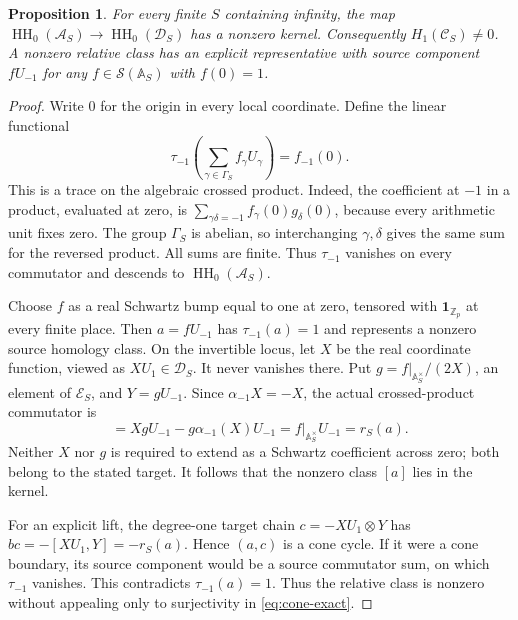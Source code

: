 \documentclass[11pt,letterpaper]{article}
\newtheorem{proposition}[theorem]{Proposition}
\theoremstyle{definition}
\theoremstyle{remark}
\newcommand{\Z}{\mathbb Z}
\newcommand{\Sch}{\mathcal S}
\newcommand{\Acal}{\mathcal A}
\newcommand{\HH}{\operatorname{HH}}
\newcommand{\ind}{\mathbf1}
\begin{document}
\begin{proposition}\label{prop:origin-class}
For every finite $S$ containing infinity, the map
$\HH_0(\Acal_S)\to\HH_0(\mathscr D_S)$ has a nonzero kernel.
Consequently $H_1(\mathscr C_S)\ne0$. A nonzero relative class
has an explicit representative with source component
$fU_{-1}$ for any $f\in\Sch(\mathbb A_S)$ with $f(0)=1$.
\end{proposition}
\begin{proof}
Write $0$ for the origin in every local coordinate. Define the
linear functional
\begin{equation}
 \tau_{-1}\left(\sum_{\gamma\in\Gamma_S}f_\gamma U_\gamma\right)
                     =f_{-1}(0).
 \label{eq:origin-trace}
\end{equation}
This is a trace on the algebraic crossed product. Indeed, the
coefficient at $-1$ in a product, evaluated at zero, is
$\sum_{\gamma\delta=-1}f_\gamma(0)g_\delta(0)$, because every
arithmetic unit fixes zero. The group $\Gamma_S$ is abelian,
so interchanging $\gamma,\delta$ gives the same sum for the
reversed product. All sums are finite. Thus $\tau_{-1}$
vanishes on every commutator and descends to $\HH_0(\Acal_S)$.

Choose $f$ as a real Schwartz bump equal to one at zero,
tensored with $\ind_{\Z_p}$ at every finite place. Then
$a=fU_{-1}$ has $\tau_{-1}(a)=1$ and represents a nonzero
source homology class.
On the invertible locus, let $X$ be the real coordinate function,
viewed as $XU_1\in\mathscr D_S$. It never vanishes there.
Put $g=f|_{\mathbb A_S^\times}/(2X)$, an element of
$\mathscr E_S$, and $Y=gU_{-1}$. Since
$\alpha_{-1}X=-X$, the actual crossed-product commutator is
\begin{equation}
 [XU_1,Y]=XgU_{-1}-g\alpha_{-1}(X)U_{-1}
                  =f|_{\mathbb A_S^\times}U_{-1}=r_S(a).
 \label{eq:origin-commutator}
\end{equation}
Neither $X$ nor $g$ is required to extend as a Schwartz
coefficient across zero; both belong to the stated target.
It follows that the nonzero class $[a]$ lies in the kernel.

For an explicit lift, the degree-one target chain
$c=-XU_1\otimes Y$ has
$bc=-[XU_1,Y]=-r_S(a)$. Hence $(a,c)$ is a cone cycle.
If it were a cone boundary, its source component would be a
source commutator sum, on which $\tau_{-1}$ vanishes.
This contradicts $\tau_{-1}(a)=1$. Thus the relative class
is nonzero without appealing only to surjectivity in
\eqref{eq:cone-exact}.
\end{proof}
\end{document}
